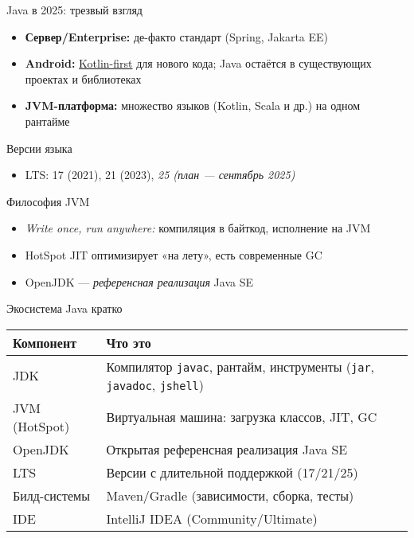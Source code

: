 \documentclass[aspectratio=169]{beamer}
\begin{document}
\begin{frame}{Java в 2025: трезвый взгляд}
  \begin{itemize}
    \item \textbf{Сервер/Enterprise:} де-факто стандарт (Spring, Jakarta EE)
    \item \textbf{Android:} \underline{Kotlin-first} для нового кода; 
    Java остаётся в существующих проектах и библиотеках
    \item \textbf{JVM-платформа:} множество языков (Kotlin, Scala и др.) 
    на одном рантайме
  \end{itemize}
  \begin{block}{Версии языка}
    \begin{itemize}
      \item LTS: 17 (2021), 21 (2023), \emph{25 (план — сентябрь 2025)}
    \end{itemize}
  \end{block}
  \begin{block}{Философия JVM}
    \begin{itemize}
      \item \emph{Write once, run anywhere:} компиляция в байткод, исполнение на JVM
      \item HotSpot JIT оптимизирует «на лету», есть современные GC
      \item OpenJDK — \emph{референсная реализация} Java SE
    \end{itemize}
  \end{block}
\end{frame}

\begin{frame}{Экосистема Java кратко}
  \small
  \begin{tabularx}{\linewidth}{l X}
    \toprule
    \textbf{Компонент} & \textbf{Что это} \\
    \midrule
    JDK & Компилятор \texttt{javac}, рантайм, инструменты (\texttt{jar}, 
    \texttt{javadoc}, \texttt{jshell}) \\
    JVM (HotSpot) & Виртуальная машина: загрузка классов, JIT, GC \\
    OpenJDK & Открытая референсная реализация Java SE \\
    LTS & Версии с длительной поддержкой (17/21/25) \\
    Билд-системы & Maven/Gradle (зависимости, сборка, тесты) \\
    IDE & IntelliJ IDEA (Community/Ultimate) \\
    \bottomrule
  \end{tabularx}
\end{frame}
\end{document}
